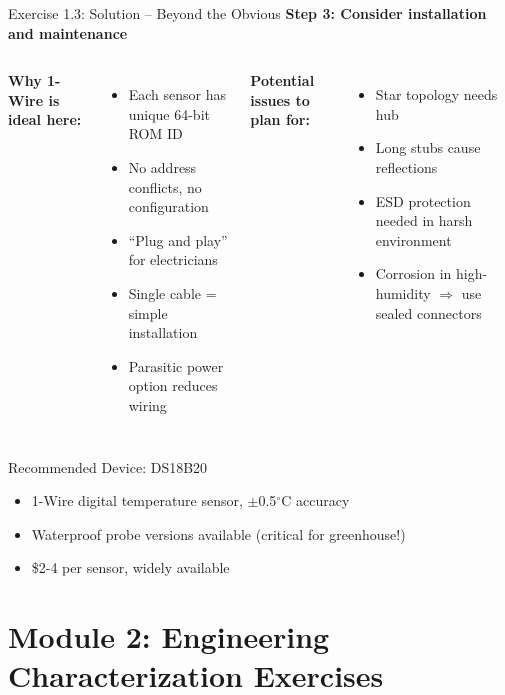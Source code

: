 \documentclass[aspectratio=169,11pt]{beamer}
\begin{document}
\begin{frame}{Exercise 1.3: Solution -- Beyond the Obvious}
    \textbf{Step 3: Consider installation and maintenance}
    
    \begin{columns}
        \textbf{Why 1-Wire is ideal here:}
        \begin{itemize}
            \item Each sensor has unique 64-bit ROM ID
            \item No address conflicts, no configuration
            \item ``Plug and play'' for electricians
            \item Single cable = simple installation
            \item Parasitic power option reduces wiring
        \end{itemize}
        
        \textbf{Potential issues to plan for:}
        \begin{itemize}
            \item Star topology needs hub
            \item Long stubs cause reflections
            \item ESD protection needed in harsh environment
            \item Corrosion in high-humidity $\Rightarrow$ use sealed connectors
        \end{itemize}
    \end{columns}
    
    \vspace{0.4cm}
    \begin{exampleblock}{Recommended Device: DS18B20}
        \begin{itemize}
            \item 1-Wire digital temperature sensor, $\pm$0.5$^\circ$C accuracy
            \item Waterproof probe versions available (critical for greenhouse!)
            \item \$2-4 per sensor, widely available
        \end{itemize}
    \end{exampleblock}
\end{frame}

\section{Module 2: Engineering Characterization Exercises}
\end{document}
